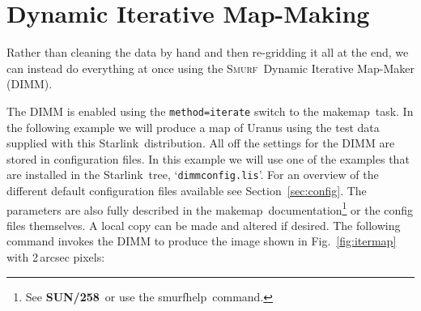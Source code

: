 \documentclass[twoside,11pt]{article}
\newcommand{\htmladdnormallink}[2]{#1}
\newcommand{\xref}[3]{#1}
\newcommand{\xlabel}[1]{}
\renewcommand{\_}{\texttt{\symbol{95}}}
\newcommand{\starlink}{\htmladdnormallink{Starlink}{http://starlink.jach.hawaii.edu}}
\newcommand{\smurf}{\xref{\textsc{Smurf}}{sun258}{}}
\newcommand{\task}[1]{\textsf{#1}}
\newcommand{\makemap}{\xref{\task{makemap}}{sun258}{MAKEMAP}}
\newcommand{\smurfhelp}{\xref{\task{smurfhelp}}{sun258}{SMURFHELP}}
\newcommand{\smurfsun}{\xref{\textbf{SUN/258}}{sun258}{}}
\begin{document}
\section{\xlabel{maps}Dynamic Iterative Map-Making}
\label{sec:maps}

Rather than cleaning the data by hand and then re-gridding it all at
the end, we can instead do everything at once using the
\smurf\ Dynamic Iterative Map-Maker (DIMM).

The DIMM is enabled using the \texttt{method=iterate} switch to the
\makemap\ task. In the following example we will produce a map of
Uranus using the test data supplied with this \starlink\
distribution. All off the settings for the DIMM are stored in
configuration files.  In this example we will use one of the examples
that are installed in the \starlink\ tree,
`\texttt{dimmconfig.lis}'. For an overview of the different default
configuration files available see Section~\ref{sec:config}. The
parameters are also fully described in the \makemap\
documentation\footnote{See \smurfsun\ or use the \smurfhelp\ command.}
or the config files themselves. A local copy can be made and altered
if desired. The following command invokes the DIMM to produce the
image shown in Fig.~\ref{fig:itermap} with 2\,arcsec pixels:
\end{document}
